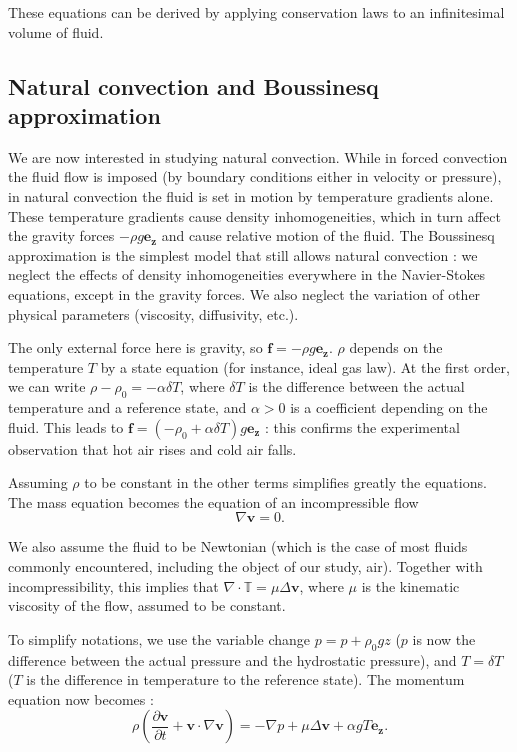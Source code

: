 \documentclass[12pt]{article}
\newcommand{\vb}[1]{\ensuremath{\mathbf{#1}}}
\begin{document}
These equations can be derived by applying conservation laws to an
infinitesimal volume of fluid.
\subsection{Natural convection and Boussinesq approximation}
We are now interested in studying natural convection. While in forced
convection the fluid flow is imposed (by boundary conditions either in
velocity or pressure), in natural convection the fluid is set in
motion by temperature gradients alone.  These temperature gradients
cause density inhomogeneities, which in turn affect the gravity forces
$- \rho g \vb{e_z}$ and cause relative motion of the fluid. The
Boussinesq approximation is the simplest model that still allows
natural convection : we neglect the effects of density inhomogeneities
everywhere in the Navier-Stokes equations, except in the gravity
forces. We also neglect the variation of other physical parameters
(viscosity, diffusivity, etc.).

The only external force here is gravity, so $\vb{f} = -\rho g
\vb{e_z}$. $\rho$ depends on the temperature $T$ by a state equation
(for instance, ideal gas law). At the first order, we can write $\rho
- \rho_0 = - \alpha \delta T$, where $\delta T$ is the difference
between the actual temperature and a reference state, and $\alpha > 0$
is a coefficient depending on the fluid. This leads to $\vb{f} =
(-\rho_0 + \alpha \delta T) g \vb{e_z}$ : this confirms the
experimental observation that hot air rises and cold air falls.

Assuming $\rho$ to be constant in the other terms simplifies greatly
the equations. The mass equation becomes the equation of an
incompressible flow
\begin{equation}
  \label{ns-b-mass}
  \nabla \vb{v} = 0.
\end{equation}

We also assume the fluid to be Newtonian (which is the case of most
fluids commonly encountered, including the object of our study,
air). Together with incompressibility, this implies that $\nabla \cdot
\mathbb T = \mu \Delta \vb{v}$, where $\mu$ is the kinematic viscosity
of the flow, assumed to be constant.

To simplify notations, we use the variable change $p = p + \rho_0 g z$
($p$ is now the difference between the actual pressure and the
hydrostatic pressure), and $T = \delta T$ ($T$ is the difference in
temperature to the reference state). The momentum equation now
becomes :
\begin{equation}
  \label{ns-mom}
  \rho \left(\frac{\partial \mathbf{v}}{\partial t} + \mathbf{v} \cdot
    \nabla \mathbf{v}\right) = -\nabla p + \mu \Delta \vb{v} + \alpha g
  T \vb{e_z}.
\end{equation}
\end{document}
